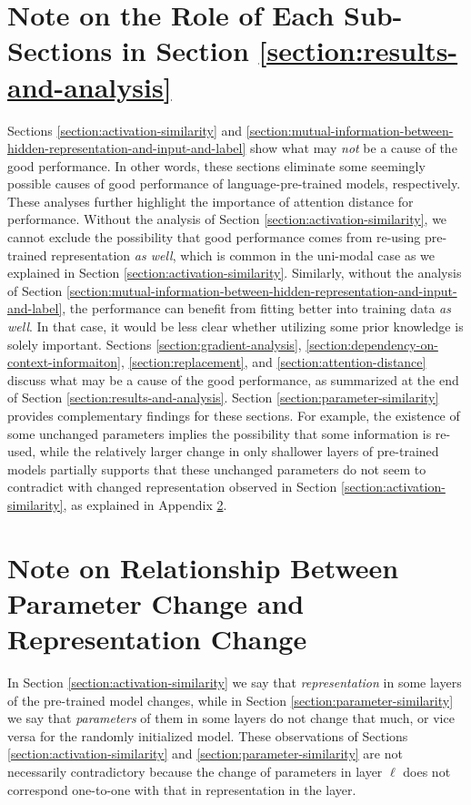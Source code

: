 \documentclass{article}
\begin{document}
\section{Note on the Role of Each Sub-Sections in Section \ref{section:results-and-analysis}}

Sections \ref{section:activation-similarity} and \ref{section:mutual-information-between-hidden-representation-and-input-and-label} show what may \textit{not} be a cause of the good performance. In other words, these sections eliminate some seemingly possible causes of good performance of language-pre-trained models, respectively. These analyses further highlight the importance of attention distance for performance. Without the analysis of Section \ref{section:activation-similarity}, we cannot exclude the possibility that good performance comes from re-using pre-trained representation \textit{as well}, which is common in the uni-modal case as we explained in Section \ref{section:activation-similarity}. Similarly, without the analysis of Section \ref{section:mutual-information-between-hidden-representation-and-input-and-label}, the performance can benefit from fitting better into training data \textit{as well}. In that case, it would be less clear whether utilizing some prior knowledge is solely important. Sections \ref{section:gradient-analysis}, \ref{section:dependency-on-context-informaiton}, \ref{section:replacement}, and \ref{section:attention-distance} discuss what may be a cause of the good performance, as summarized at the end of Section \ref{section:results-and-analysis}. Section \ref{section:parameter-similarity} provides complementary findings for these sections. For example, the existence of some unchanged parameters implies the possibility that some information is re-used, while the relatively larger change in only shallower layers of pre-trained models partially supports that these unchanged parameters do not seem to contradict with changed representation observed in Section \ref{section:activation-similarity}, as explained in Appendix \ref{appendix:note-on-relationship-between-parameter-change-and-representation-change}.

\section{Note on Relationship Between Parameter Change and Representation Change}
\label{appendix:note-on-relationship-between-parameter-change-and-representation-change}

In Section \ref{section:activation-similarity} we say that \textit{representation} in some layers of the pre-trained model changes, while in Section \ref{section:parameter-similarity} we say that \textit{parameters} of them in some layers do not change that much, or vice versa for the randomly initialized model. These observations of Sections \ref{section:activation-similarity} and \ref{section:parameter-similarity} are not necessarily contradictory because the change of parameters in layer $\ell$ does not correspond one-to-one with that in representation in the layer.
\end{document}

